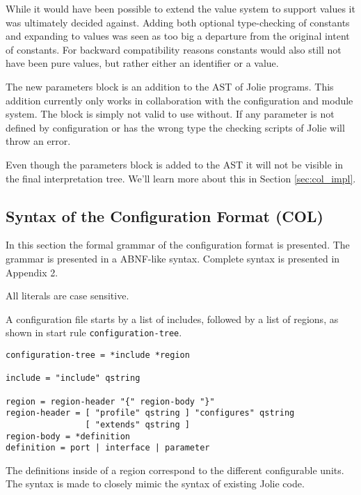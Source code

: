 While it would have been possible to extend the value system to support values
it was ultimately decided against. Adding both optional type-checking of
constants and expanding to values was seen as too big a departure from the
original intent of constants. For backward compatibility reasons constants
would also still not have been pure values, but rather either an identifier or
a value.

The new parameters block is an addition to the AST of Jolie programs. This
addition currently only works in collaboration with the configuration and
module system. The block is simply not valid to use without. If any parameter
is not defined by configuration or has the wrong type the checking scripts of
Jolie will throw an error.

Even though the parameters block is added to the AST it will not be visible in
the final interpretation tree. We'll learn more about this in Section
\ref{sec:col_impl}.



\subsection{Syntax of the Configuration Format (COL)}

In this section the formal grammar of the configuration format is presented.
The grammar is presented in a ABNF-like syntax. Complete syntax is presented in
Appendix 2.

All literals are case sensitive.

A configuration file starts by a list of includes, followed by a list of
regions, as shown in start rule \texttt{configuration-tree}.

\begin{verbatim}
configuration-tree = *include *region

include = "include" qstring

region = region-header "{" region-body "}"
region-header = [ "profile" qstring ] "configures" qstring
                [ "extends" qstring ]
region-body = *definition
definition = port | interface | parameter
\end{verbatim}

The definitions inside of a region correspond to the different configurable
units. The syntax is made to closely mimic the syntax of existing Jolie code.

